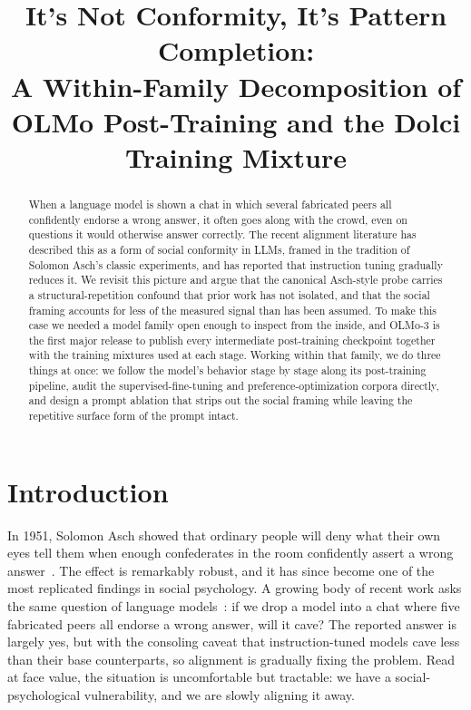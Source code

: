 \documentclass{article}
\title{It's Not Conformity, It's Pattern Completion:\\ A Within-Family Decomposition of OLMo Post-Training and the Dolci Training Mixture}
\begin{document}
\maketitle

\begin{abstract}
When a language model is shown a chat in which several fabricated peers all confidently endorse a wrong answer, it often goes along with the crowd, even on questions it would otherwise answer correctly. The recent alignment literature has described this as a form of social conformity in LLMs, framed in the tradition of Solomon Asch's classic experiments, and has reported that instruction tuning gradually reduces it. We revisit this picture and argue that the canonical Asch-style probe carries a structural-repetition confound that prior work has not isolated, and that the social framing accounts for less of the measured signal than has been assumed. To make this case we needed a model family open enough to inspect from the inside, and OLMo-3 is the first major release to publish every intermediate post-training checkpoint together with the training mixtures used at each stage. Working within that family, we do three things at once: we follow the model's behavior stage by stage along its post-training pipeline, audit the supervised-fine-tuning and preference-optimization corpora directly, and design a prompt ablation that strips out the social framing while leaving the repetitive surface form of the prompt intact.
\end{abstract}


\section{Introduction}
\label{sec:intro}

In 1951, Solomon Asch showed that ordinary people will deny what their own eyes tell them when enough confederates in the room confidently assert a wrong answer~\citep{asch1956}. The effect is remarkably robust, and it has since become one of the most replicated findings in social psychology. A growing body of recent work asks the same question of language models~\citep{zhu2025conformity, weng2025benchform, shoval2025psychiatric}: if we drop a model into a chat where five fabricated peers all endorse a wrong answer, will it cave? The reported answer is largely yes, but with the consoling caveat that instruction-tuned models cave less than their base counterparts, so alignment is gradually fixing the problem. Read at face value, the situation is uncomfortable but tractable: we have a social-psychological vulnerability, and we are slowly aligning it away.
\end{document}
